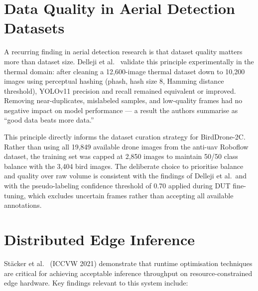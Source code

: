 \documentclass[12pt,a4paper]{report}
\begin{document}
\section{Data Quality in Aerial Detection Datasets}

A recurring finding in aerial detection research is that dataset quality
matters more than dataset size. Delleji et al.~\cite{delleji2025thermal}
validate this principle experimentally in the thermal domain: after
cleaning a 12,600-image thermal dataset down to 10,200 images using
perceptual hashing (phash, hash size 8, Hamming distance threshold),
YOLOv11 precision and recall remained equivalent or improved. Removing
near-duplicates, mislabeled samples, and low-quality frames had no
negative impact on model performance --- a result the authors summarise
as ``good data beats more data.''

This principle directly informs the dataset curation strategy for
BirdDrone-2C. Rather than using all 19,849 available drone images from
the anti-uav Roboflow dataset, the training set was capped at 2,850
images to maintain 50/50 class balance with the 3,404 bird images.
The deliberate choice to prioritise balance and quality over raw volume
is consistent with the findings of Delleji et al.\ and with the
pseudo-labeling confidence threshold of 0.70 applied during DUT
fine-tuning, which excludes uncertain frames rather than accepting
all available annotations.

\section{Distributed Edge Inference}

Stäcker et al.~\cite{stacker2021} (ICCVW 2021) demonstrate that runtime
optimisation techniques are critical for achieving acceptable inference throughput
on resource-constrained edge hardware. Key findings relevant to this system include:
\end{document}
